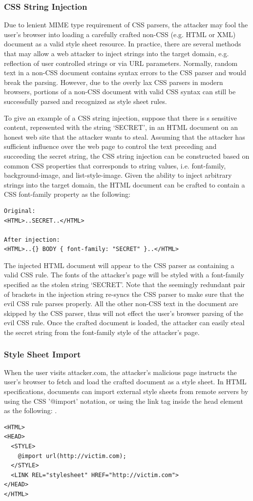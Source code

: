 \documentclass{acm_proc_article-sp}
\begin{document}
{\subsubsection{CSS String Injection}
Due to lenient MIME type requirement of CSS parsers, the attacker may fool the user's browser into loading a carefully crafted non-CSS (e.g. HTML or XML) document as a valid style sheet resource. In practice, there are several methods that may allow a web attacker to inject strings into the target domain, e.g. reflection of user controlled strings or via URL parameters. Normally, random text in a non-CSS document contains syntax errors to the CSS parser and would break the parsing. However, due to the overly lax CSS parsers in modern browsers, portions of a non-CSS document with valid CSS syntax can still be successfully parsed and recognized as style sheet rules.

To give an example of a CSS string injection, suppose that there is s sensitive content, represented with the string `SECRET', in an HTML document on an honest web site that the attacker wants to steal. Assuming that the attacker has sufficient influence over the web page to control the text preceding and succeeding the secret string, the CSS string injection can be constructed based on common CSS properties that corresponds to string values, i.e. font-family, background-image, and list-style-image. Given the ability to inject arbitrary strings into the target domain, the HTML document can be crafted to contain a CSS font-family property as the following:
\begin{verbatim}
Original:
<HTML>..SECRET..</HTML>

After injection:
<HTML>..{} BODY { font-family: "SECRET" }..</HTML>
\end{verbatim}
The injected HTML document will appear to the CSS parser as containing a valid CSS rule. The fonts of the attacker's page will be styled with a font-family specified as the stolen string `SECRET'. Note that the seemingly redundant pair of brackets in the injection string re-syncs the CSS parser to make sure that the evil CSS rule parses properly. All the other non-CSS text in the document are skipped by the CSS parser, thus will not effect the user's browser parsing of the evil CSS rule. Once the crafted document is loaded, the attacker can easily steal the secret string from the font-family style of the attacker's page.

\subsubsection{Style Sheet Import}
When the user visits attacker.com, the attacker's malicious page instructs the user's browser to fetch and load the crafted document as a style sheet. In HTML specifications\cite{html}, documents can import external style sheets from remote servers by using the CSS '@import' notation, or using the link tag inside the head element as the following: .
\begin{verbatim}
<HTML>
<HEAD>
  <STYLE>
    @import url(http://victim.com);
  </STYLE>
  <LINK REL="stylesheet" HREF="http://victim.com">
</HEAD>
</HTML>
\end{verbatim}
}
\end{document}
